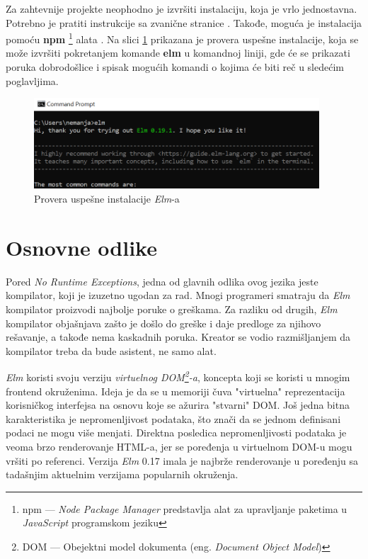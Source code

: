 \documentclass[12pt,oneside]{memoir}
\begin{document}
Za zahtevnije projekte neophodno je izvršiti instalaciju, koja je vrlo
jednostavna. Potrebno je pratiti instrukcije sa zvanične stranice
\cite{installelm}. Takođe, moguća je instalacija pomoću \textbf{npm}
\footnote{npm --- \emph{Node Package Manager} predstavlja alat za upravljanje paketima u 
\emph{JavaScript} programskom jeziku} alata \cite{npm}.
Na slici \ref{fig:elm-cmd} prikazana je provera uspešne instalacije, koja se može izvršiti
pokretanjem komande \textbf{elm} u komandnoj liniji, gde će se prikazati poruka
dobrodošlice i spisak mogućih komandi o kojima će biti reč u sledećim poglavljima.
\begin{figure}[!ht]
  \centering
  \includegraphics[width=0.95\textwidth]{elm-cmd.png}
  \caption{Provera uspešne instalacije \emph{Elm}-a}
  \label{fig:elm-cmd}
\end{figure}

\section{Osnovne odlike}
Pored \emph{No Runtime Exceptions}, jedna od glavnih odlika ovog jezika jeste
kompilator, koji je izuzetno ugodan za rad. Mnogi programeri smatraju da \emph{Elm}
kompilator proizvodi najbolje poruke o greškama. Za razliku od drugih, \emph{Elm}
kompilator objašnjava zašto je došlo do greške i daje predloge za njihovo rešavanje,
a takođe nema kaskadnih poruka. Kreator se vodio razmišljanjem da kompilator treba
da bude asistent, ne samo alat.

\emph{Elm} koristi svoju verziju \emph{virtuelnog DOM\footnote{DOM --- Obejektni model
dokumenta (eng. \emph{Document Object Model})\cite{dom}}-a}, koncepta koji se koristi u mnogim
frontend okruženima. Ideja je da se u memoriji čuva "virtuelna" reprezentacija
korisničkog interfejsa na osnovu koje se ažurira "stvarni" DOM. Još jedna bitna
karakteristika je nepromenljivost podataka, što znači da se jednom definisani
podaci ne mogu više menjati. Direktna posledica nepromenljivosti podataka je veoma
brzo renderovanje HTML-a, jer se poređenja u virtuelnom DOM-u mogu vršiti po referenci. 
Verzija \emph{Elm} 0.17 imala je najbrže renderovanje u poređenju sa tadašnjim aktuelnim verzijama 
popularnih okruženja\cite{elm-html}.
\end{document}
